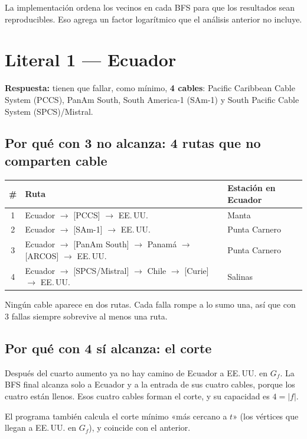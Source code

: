 \documentclass[11pt,a4paper]{article}
\begin{document}
{\small La implementación ordena los vecinos en cada BFS para que los resultados sean reproducibles. Eso agrega un factor logarítmico que el análisis anterior no incluye.\par}

\newpage
\section*{Literal 1 --- Ecuador}
\begin{respuesta}
\textbf{Respuesta:} tienen que fallar, como mínimo, \textbf{4 cables}: Pacific Caribbean Cable System (PCCS), PanAm South, South America-1 (SAm-1) y South Pacific Cable System (SPCS)/Mistral.
\end{respuesta}

\subsection*{Por qué con 3 no alcanza: 4 rutas que no comparten cable}
\begin{tabularx}{\textwidth}{@{}c X l@{}}
\toprule
\# & Ruta & Estación en Ecuador\\
\midrule
1 & Ecuador $\to$ [PCCS] $\to$ EE.\,UU. & Manta\\
2 & Ecuador $\to$ [SAm-1] $\to$ EE.\,UU. & Punta Carnero\\
3 & Ecuador $\to$ [PanAm South] $\to$ Panamá $\to$ [ARCOS] $\to$ EE.\,UU. & Punta Carnero\\
4 & Ecuador $\to$ [SPCS/Mistral] $\to$ Chile $\to$ [Curie] $\to$ EE.\,UU. & Salinas\\
\bottomrule
\end{tabularx}

Ningún cable aparece en dos rutas. Cada falla rompe a lo sumo una, así que con 3 fallas siempre sobrevive al menos una ruta.

\subsection*{Por qué con 4 sí alcanza: el corte}
Después del cuarto aumento ya no hay camino de Ecuador a EE.\,UU. en $G_f$. La BFS final alcanza solo a Ecuador y a la entrada de sus cuatro cables, porque los cuatro están llenos. Esos cuatro cables forman el corte, y su capacidad es $4=|f|$.

El programa también calcula el corte mínimo «más cercano a $t$» (los vértices que llegan a EE.\,UU. en $G_f$), y coincide con el anterior.
\end{document}
